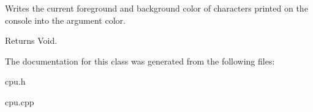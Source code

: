 Writes the current foreground and background color of characters printed on the console into the argument color. 

\begin{DoxyReturn}{Returns}
Void. 
\end{DoxyReturn}


The documentation for this class was generated from the following files\+:\begin{DoxyCompactItemize}
\item 
cpu.\+h\item 
cpu.\+cpp\end{DoxyCompactItemize}

